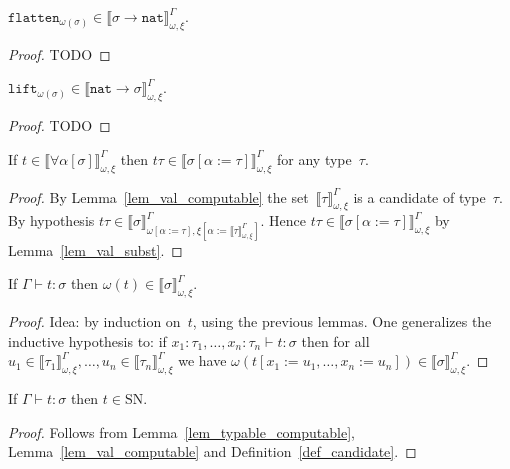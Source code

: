 \documentclass[runningheads,a4paper]{llncs}
\newcommand{\subst}[2]{#1:=#2}
\newcommand{\nat}{\mathtt{nat}}
\newcommand{\flatten}{\mathtt{flatten}}
\newcommand{\lift}{\mathtt{lift}}
\newcommand{\SN}{\mathrm{SN}}
\newcommand{\val}[3]{\ensuremath{\llbracket#1\rrbracket_{#2}^{#3}}}
\newcommand{\proves}{\vdash}
\begin{document}
\begin{lemma}
  $\flatten_{\omega(\sigma)} \in
  \val{\sigma\to\nat}{\omega,\xi}{\Gamma}$.
\end{lemma}

\begin{proof}
  TODO
\end{proof}

\begin{lemma}
  $\lift_{\omega(\sigma)} \in
  \val{\nat\to\sigma}{\omega,\xi}{\Gamma}$.
\end{lemma}

\begin{proof}
  TODO
\end{proof}

\begin{lemma}
  If $t \in \val{\forall\alpha[\sigma]}{\omega,\xi}{\Gamma}$ then
  $t \tau \in \val{\sigma[\subst{\alpha}{\tau}]}{\omega,\xi}{\Gamma}$
  for any type~$\tau$.
\end{lemma}

\begin{proof}
  By Lemma~\ref{lem_val_computable} the
  set~$\val{\tau}{\omega,\xi}{\Gamma}$ is a candidate of
  type~$\tau$. By hypothesis
  $t \tau \in
  \val{\sigma}{\omega[\subst{\alpha}{\tau}],\xi[\subst{\alpha}{\val{\tau}{\omega,\xi}{\Gamma}}]}{\Gamma}$. Hence
  $t \tau \in \val{\sigma[\subst{\alpha}{\tau}]}{\omega,\xi}{\Gamma}$
  by Lemma~\ref{lem_val_subst}.
\end{proof}

\begin{lemma}\label{lem_typable_computable}
  If $\Gamma \proves t : \sigma$ then
  $\omega(t) \in \val{\sigma}{\omega,\xi}{\Gamma}$.
\end{lemma}

\begin{proof}
  Idea: by induction on~$t$, using the previous lemmas. One
  generalizes the inductive hypothesis to: if
  $x_1 : \tau_1,\ldots,x_n:\tau_n \proves t : \sigma$ then for all
  $u_1\in\val{\tau_1}{\omega,\xi}{\Gamma},\ldots,u_n\in\val{\tau_n}{\omega,\xi}{\Gamma}$
  we have
  $\omega(t[\subst{x_1}{u_1},\ldots,\subst{x_n}{u_n}]) \in
  \val{\sigma}{\omega,\xi}{\Gamma}$.
\end{proof}

\begin{corollary}
  If $\Gamma \proves t : \sigma$ then $t \in \SN$.
\end{corollary}

\begin{proof}
  Follows from Lemma~\ref{lem_typable_computable},
  Lemma~\ref{lem_val_computable} and Definition~\ref{def_candidate}.
\end{proof}
\end{document}
